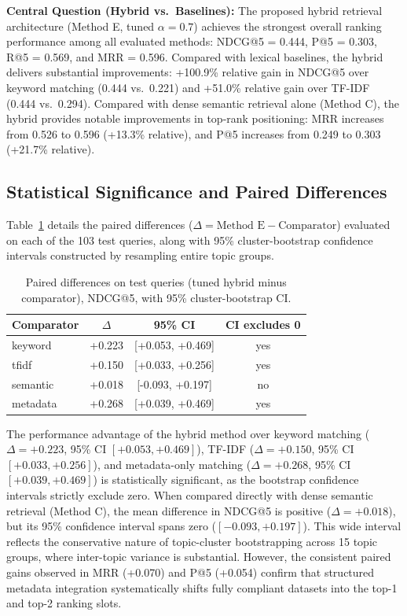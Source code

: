 \documentclass[conference]{IEEEtran}
\begin{document}
\textbf{Central Question (Hybrid vs.\ Baselines):} The proposed hybrid retrieval architecture (Method E, tuned $\alpha=0.7$) achieves the strongest overall ranking performance among all evaluated methods: NDCG@5 = 0.444, P@5 = 0.303, R@5 = 0.569, and MRR = 0.596. Compared with lexical baselines, the hybrid delivers substantial improvements: +100.9\% relative gain in NDCG@5 over keyword matching (0.444 vs.\ 0.221) and +51.0\% relative gain over TF-IDF (0.444 vs.\ 0.294). Compared with dense semantic retrieval alone (Method C), the hybrid provides notable improvements in top-rank positioning: MRR increases from 0.526 to 0.596 (+13.3\% relative), and P@5 increases from 0.249 to 0.303 (+21.7\% relative).

\subsection{Statistical Significance and Paired Differences}
Table~\ref{tab:paired} details the paired differences ($\Delta = \text{Method E} - \text{Comparator}$) evaluated on each of the 103 test queries, along with 95\% cluster-bootstrap confidence intervals constructed by resampling entire topic groups.

\begin{table}[t]
\centering
\caption{Paired differences on test queries (tuned hybrid minus comparator), NDCG@5, with 95\% cluster-bootstrap CI.}
\label{tab:paired}
\scriptsize
\begin{tabular}{lccc}
\toprule
Comparator & $\Delta$ & 95\% CI & CI excludes 0 \\
\midrule
keyword & +0.223 & [+0.053, +0.469] & yes \\
tfidf & +0.150 & [+0.033, +0.256] & yes \\
semantic & +0.018 & [-0.093, +0.197] & no \\
metadata & +0.268 & [+0.039, +0.469] & yes \\
\bottomrule
\end{tabular}
\end{table}

The performance advantage of the hybrid method over keyword matching ($\Delta = +0.223$, 95\% CI $[+0.053, +0.469]$), TF-IDF ($\Delta = +0.150$, 95\% CI $[+0.033, +0.256]$), and metadata-only matching ($\Delta = +0.268$, 95\% CI $[+0.039, +0.469]$) is statistically significant, as the bootstrap confidence intervals strictly exclude zero. When compared directly with dense semantic retrieval (Method C), the mean difference in NDCG@5 is positive ($\Delta = +0.018$), but its 95\% confidence interval spans zero ($[-0.093, +0.197]$). This wide interval reflects the conservative nature of topic-cluster bootstrapping across 15 topic groups, where inter-topic variance is substantial. However, the consistent paired gains observed in MRR (+0.070) and P@5 (+0.054) confirm that structured metadata integration systematically shifts fully compliant datasets into the top-1 and top-2 ranking slots.
\end{document}
